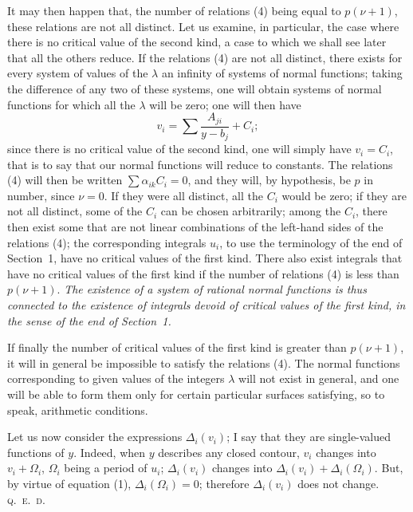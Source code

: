 \documentclass{article}
\begin{document}
It may then happen that, the number of relations (4) being equal to $p(\nu + 1)$, these relations are not all distinct. Let us examine, in particular, the case where there is no critical value of the second kind, a case to which we shall see later that all the others reduce. If the relations (4) are not all distinct, there exists for every system of values of the $\lambda$ an infinity of systems of normal functions; taking the difference of any two of these systems, one will obtain systems of normal functions for which all the $\lambda$ will be zero; one will then have
\[
v_{i} = \sum \frac{A_{ji}}{y - b_{j}} + C_{i};
\]
since there is no critical value of the second kind, one will simply have $v_{i} = C_{i}$, that is to say that our normal functions will reduce to constants. The relations (4) will then be written $\displaystyle\sum \alpha_{ik} C_{i} = 0$, and they will, by hypothesis, be $p$ in number, since $\nu = 0$. If they were all distinct, all the $C_{i}$ would be zero; if they are not all distinct, some of the $C_{i}$ can be chosen arbitrarily; among the $C_{i}$, there then exist some that are not linear combinations of the left-hand sides of the relations (4); the corresponding integrals $u_{i}$, to use the terminology of the end of Section~1, have no critical values of the first kind. There also exist integrals that have no critical values of the first kind if the number of relations (4) is less than $p(\nu + 1)$. \emph{The existence of a system of rational normal functions is thus connected to the existence of integrals}
\emph{devoid of critical values of the first kind, in the sense of the end of Section~1.}

If finally the number of critical values of the first kind is greater than $p(\nu + 1)$, it will in general be impossible to satisfy the relations (4). The normal functions corresponding to given values of the integers $\lambda$ will not exist in general, and one will be able to form them only for certain particular surfaces satisfying, so to speak, arithmetic conditions.

Let us now consider the expressions $\Delta_{i}(v_{i})$; I say that they are single-valued functions of $y$. Indeed, when $y$ describes any closed contour, $v_{i}$ changes into $v_{i} + \Omega_{i}$, $\Omega_{i}$ being a period of $u_{i}$; $\Delta_{i}(v_{i})$ changes into $\Delta_{i}(v_{i}) + \Delta_{i}(\Omega_{i})$. But, by virtue of equation (1), $\Delta_{i}(\Omega_{i}) = 0$; therefore $\Delta_{i}(v_{i})$ does not change. \hfill\textsc{q.~e.~d.}
\end{document}
